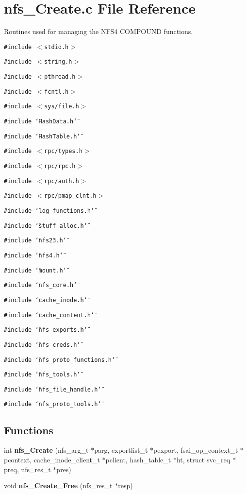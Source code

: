 \section{nfs\_\-Create.c File Reference}
\label{nfs__Create_8c}
Routines used for managing the NFS4 COMPOUND functions. 

{\tt \#include $<$stdio.h$>$}\par
{\tt \#include $<$string.h$>$}\par
{\tt \#include $<$pthread.h$>$}\par
{\tt \#include $<$fcntl.h$>$}\par
{\tt \#include $<$sys/file.h$>$}\par
{\tt \#include \char`\"{}Hash\-Data.h\char`\"{}}\par
{\tt \#include \char`\"{}Hash\-Table.h\char`\"{}}\par
{\tt \#include $<$rpc/types.h$>$}\par
{\tt \#include $<$rpc/rpc.h$>$}\par
{\tt \#include $<$rpc/auth.h$>$}\par
{\tt \#include $<$rpc/pmap\_\-clnt.h$>$}\par
{\tt \#include \char`\"{}log\_\-functions.h\char`\"{}}\par
{\tt \#include \char`\"{}stuff\_\-alloc.h\char`\"{}}\par
{\tt \#include \char`\"{}nfs23.h\char`\"{}}\par
{\tt \#include \char`\"{}nfs4.h\char`\"{}}\par
{\tt \#include \char`\"{}mount.h\char`\"{}}\par
{\tt \#include \char`\"{}nfs\_\-core.h\char`\"{}}\par
{\tt \#include \char`\"{}cache\_\-inode.h\char`\"{}}\par
{\tt \#include \char`\"{}cache\_\-content.h\char`\"{}}\par
{\tt \#include \char`\"{}nfs\_\-exports.h\char`\"{}}\par
{\tt \#include \char`\"{}nfs\_\-creds.h\char`\"{}}\par
{\tt \#include \char`\"{}nfs\_\-proto\_\-functions.h\char`\"{}}\par
{\tt \#include \char`\"{}nfs\_\-tools.h\char`\"{}}\par
{\tt \#include \char`\"{}nfs\_\-file\_\-handle.h\char`\"{}}\par
{\tt \#include \char`\"{}nfs\_\-proto\_\-tools.h\char`\"{}}\par
\subsection*{Functions}
\begin{CompactItemize}
\item 
int {\bf nfs\_\-Create} (nfs\_\-arg\_\-t $\ast$parg, exportlist\_\-t $\ast$pexport, fsal\_\-op\_\-context\_\-t $\ast$pcontext, cache\_\-inode\_\-client\_\-t $\ast$pclient, hash\_\-table\_\-t $\ast$ht, struct svc\_\-req $\ast$preq, nfs\_\-res\_\-t $\ast$pres)
\item 
void {\bf nfs\_\-Create\_\-Free} (nfs\_\-res\_\-t $\ast$resp)
\end{CompactItemize}


